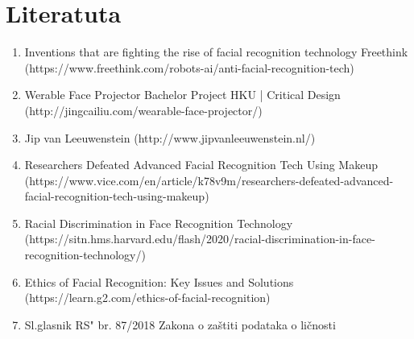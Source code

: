 \documentclass{article}
\begin{document}
\section{Literatuta}
\begin{enumerate}
  \setcounter{enumi}{0}
  \renewcommand{\labelenumi}{[\arabic{enumi}]}
  
  \item Inventions that are fighting the rise of facial recognition technology Freethink (https://www.freethink.com/robots-ai/anti-facial-recognition-tech)
  \item Werable Face Projector Bachelor Project HKU | Critical Design (http://jingcailiu.com/wearable-face-projector/)
  \item Jip van Leeuwenstein (http://www.jipvanleeuwenstein.nl/)
  \item Researchers Defeated Advanced Facial Recognition Tech Using Makeup (https://www.vice.com/en/article/k78v9m/researchers-defeated-advanced-facial-recognition-tech-using-makeup)
  \item Racial Discrimination in Face Recognition Technology (https://sitn.hms.harvard.edu/flash/2020/racial-discrimination-in-face-recognition-technology/)
  \item Ethics of Facial Recognition: Key Issues and Solutions (https://learn.g2.com/ethics-of-facial-recognition)
  \item Sl.glasnik RS" br. 87/2018 Zakona o zaštiti podataka o ličnosti 
\end{enumerate}
\newpage
\end{document}
